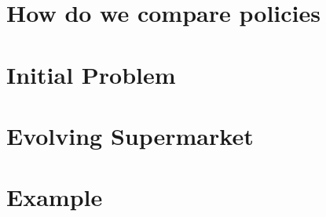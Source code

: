 \chapter{How do we compare policies}

\chapter{Initial Problem}

\chapter{Evolving Supermarket}

\chapter{Example}
